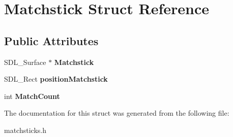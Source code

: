\hypertarget{structMatchstick}{}\section{Matchstick Struct Reference}
\label{structMatchstick}
\subsection*{Public Attributes}
\begin{DoxyCompactItemize}
\item 
\mbox{\label{structMatchstick_abf32429755f84e6d66e91498255c618f}} 
S\+D\+L\+\_\+\+Surface $\ast$ {\bfseries Matchstick}
\item 
\mbox{\label{structMatchstick_a94b7cf5a0090423782617da879344d2b}} 
S\+D\+L\+\_\+\+Rect {\bfseries position\+Matchstick}
\item 
\mbox{\label{structMatchstick_a7b99dba66cb2d9fabe1c74ab96c677b2}} 
int {\bfseries Match\+Count}
\end{DoxyCompactItemize}


The documentation for this struct was generated from the following file\+:\begin{DoxyCompactItemize}
\item 
matchsticks.\+h\end{DoxyCompactItemize}
